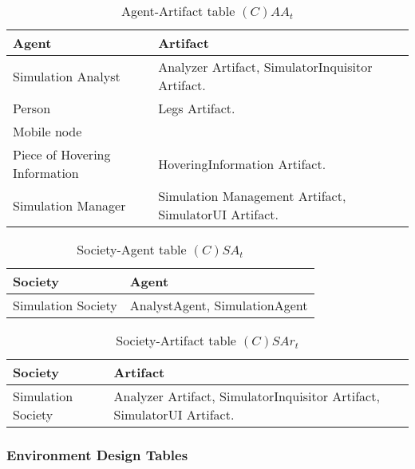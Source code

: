 \begin{table}[H]
	\centering
	\begin{tabular}{|p{4cm}|p{8cm}|}
			\hline
			\textbf{Agent} & \textbf{Artifact} \\
			\hline
			Simulation Analyst & Analyzer Artifact, SimulatorInquisitor Artifact. \\
			\hline
			Person & Legs Artifact. \\
			\hline
			Mobile node & \\
			\hline
			Piece of Hovering Information & HoveringInformation Artifact. \\
			\hline
			Simulation Manager & Simulation Management Artifact, SimulatorUI
			Artifact. \\
			\hline
		\end{tabular}
	\caption{Agent-Artifact table $(C)AA_t$}
	\label{tab:caat}
\end{table}

\begin{table}[H]
	\centering
	\begin{tabular}{|p{4cm}|p{8cm}|}
			\hline
			\textbf{Society} & \textbf{Agent} \\
			\hline
			Simulation Society & AnalystAgent, SimulationAgent\\
			\hline
		\end{tabular}
	\caption{Society-Agent table $(C)SA_t$}
	\label{tab:csat}
\end{table}

\begin{table}[H]
	\centering
	\begin{tabular}{|p{4cm}|p{8cm}|}
			\hline
			\textbf{Society} & \textbf{Artifact} \\
			\hline
			Simulation Society & Analyzer Artifact, SimulatorInquisitor Artifact,
			SimulatorUI Artifact. \\
			\hline
		\end{tabular}
	\caption{Society-Artifact table $(C)SAr_t$}
	\label{tab:csart}
\end{table}

\subsubsection{Environment Design Tables}

